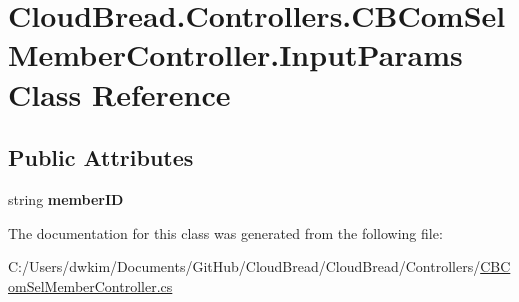 \hypertarget{class_cloud_bread_1_1_controllers_1_1_c_b_com_sel_member_controller_1_1_input_params}{}\section{Cloud\+Bread.\+Controllers.\+C\+B\+Com\+Sel\+Member\+Controller.\+Input\+Params Class Reference}
\label{class_cloud_bread_1_1_controllers_1_1_c_b_com_sel_member_controller_1_1_input_params}
\subsection*{Public Attributes}
\begin{DoxyCompactItemize}
\item 
string {\bfseries member\+ID}\hypertarget{class_cloud_bread_1_1_controllers_1_1_c_b_com_sel_member_controller_1_1_input_params_ad75a94e40a6bda7b1177c7a30560a79e}{}\label{class_cloud_bread_1_1_controllers_1_1_c_b_com_sel_member_controller_1_1_input_params_ad75a94e40a6bda7b1177c7a30560a79e}

\end{DoxyCompactItemize}


The documentation for this class was generated from the following file\+:\begin{DoxyCompactItemize}
\item 
C\+:/\+Users/dwkim/\+Documents/\+Git\+Hub/\+Cloud\+Bread/\+Cloud\+Bread/\+Controllers/\hyperlink{_c_b_com_sel_member_controller_8cs}{C\+B\+Com\+Sel\+Member\+Controller.\+cs}\end{DoxyCompactItemize}
